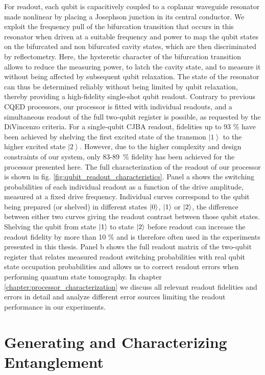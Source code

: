 For readout, each qubit is capacitively coupled to
a coplanar waveguide resonator made nonlinear by placing a Josephson
junction in its central conductor. We exploit the frequency pull of
the bifurcation transition that occurs in this resonator when driven
at a suitable frequency and power to map the qubit
states on the bifurcated and non bifurcated cavity states, which are
then discriminated by reflectometry. Here, the hysteretic
character of the bifurcation transition allows to reduce the measuring
power, to latch the cavity state, and to measure it without being
affected by subsequent qubit relaxation. The state of the resonator
can thus be determined reliably without being limited by qubit relaxation,
thereby providing a high-fidelity single-shot qubit readout. Contrary
to previous CQED processors, our processor is fitted with individual
readouts, and a simultaneous readout of the full two-qubit register
is possible, as requested by the DiVincenzo criteria. For a single-qubit
CJBA readout, fidelities up to 93 \% have been achieved
\citep{mallet_single-shot_2009} by shelving the first excited state
of the transmon $\left|1\right\rangle $ to the higher
excited state $\left|2\right\rangle $. However, due to the higher
complexity and design constraints of our system, only \mbox{83-89 \%} fidelity
has been achieved for the processor presented here. The full characterization
of the readout of our processor is shown in fig.
\ref{fig:qubit_readout_characteristics}. Panel a
shows the switching probabilities of each individual
readout as a function of the drive amplitude, measured at a fixed
drive frequency. Individual curves correspond to the qubit being prepared
(or shelved) in different states $\left| 0 \right>$, $\left| 1 \right>$
or $\left| 2 \right>$, the difference between either two curves giving the
readout contrast between those qubit states. Shelving
the qubit from state $\left| 1 \right>$ to state $\left| 2 \right>$ before readout
can increase the readout fidelity by more than 10 \% and is therefore
often used in the experiments presented in this thesis. Panel b shows the full readout matrix
of the two-qubit register that relates measured readout switching
probabilities with real qubit state occupation probabilities and allows
us to correct readout errors when performing quantum state tomography.
In chapter \ref{chapter:processor_characterization} we discuss all relevant readout fidelities
and errors in detail and analyze different error sources limiting
the readout performance in our experiments.


\section{Generating and Characterizing Entanglement}

